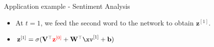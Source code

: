 \begin{frame} {Application example - Sentiment Analysis}
  \begin{itemize}
    \item At $t = 1$, we feed the second word to the network to obtain $\mathbf{z}^{[1]}$.
    \item $\mathbf{z}^{[1]} = \sigma(\mathbf{V}^\top\textcolor{red}{\mathbf{z}^{[0]}} + \mathbf{W}^\top \xv^{[1]} + \mathbf{b})$
  \end{itemize}
  \begin{figure}
      \centering
  \end{figure}
\end{frame}

